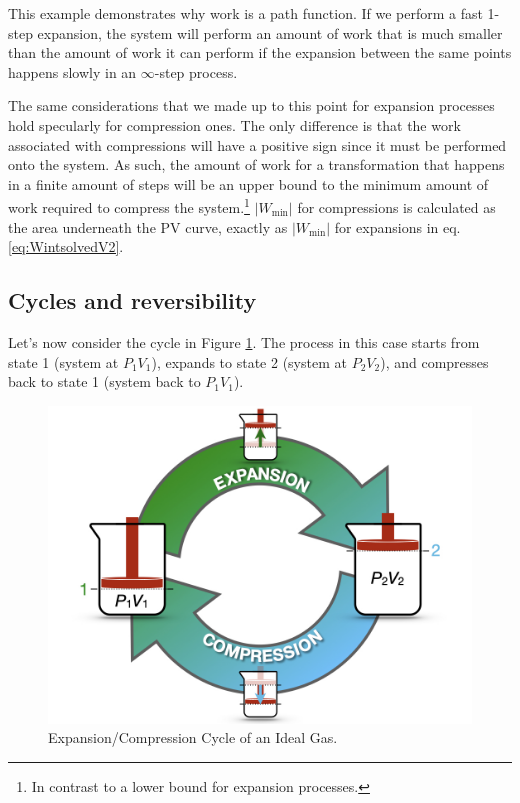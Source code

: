 \documentclass[
]{book}
\theoremstyle{definition}
\theoremstyle{definition}
\theoremstyle{definition}
\theoremstyle{remark}
\begin{document}
This example demonstrates why work is a path function. If we perform a fast 1-step expansion, the system will perform an amount of work that is much smaller than the amount of work it can perform if the expansion between the same points happens slowly in an \(\infty\)-step process.

The same considerations that we made up to this point for expansion processes hold specularly for compression ones. The only difference is that the work associated with compressions will have a positive sign since it must be performed onto the system. As such, the amount of work for a transformation that happens in a finite amount of steps will be an upper bound to the minimum amount of work required to compress the system.\footnote{In contrast to a lower bound for expansion processes.} \(\left| W_{\text{min}} \right|\) for compressions is calculated as the area underneath the PV curve, exactly as \(\left| W_{\text{min}} \right|\) for expansions in eq. \eqref{eq:WintsolvedV2}.

\hypertarget{cycles-and-reversibility}{%
\subsection{Cycles and reversibility}\label{cycles-and-reversibility}}

Let's now consider the cycle in Figure \ref{fig:FigRevCyc}. The process in this case starts from state 1 (system at \(P_1V_1\)), expands to state 2 (system at \(P_2V_2\)), and compresses back to state 1 (system back to \(P_1V_1\)).

\begin{figure}

{\centering \includegraphics[width=0.8\linewidth]{./img/OEP_Figures.005} 

}

\caption{Expansion/Compression Cycle of an Ideal Gas.}\label{fig:FigRevCyc}
\end{figure}
\end{document}
